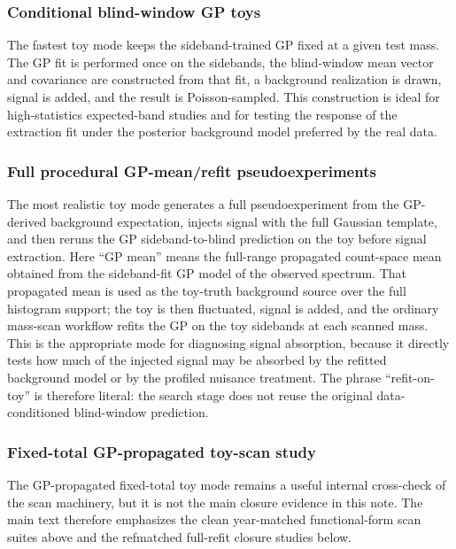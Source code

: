\FloatBarrier

\subsubsection{Conditional blind-window GP toys}

The fastest toy mode keeps the sideband-trained GP fixed at a given test mass. The GP
fit is performed once on the sidebands, the blind-window mean vector and covariance are
constructed from that fit, a background realization is drawn, signal is added, and the
result is Poisson-sampled. This construction is ideal for high-statistics expected-band
studies and for testing the response of the extraction fit under the posterior
background model preferred by the real data.

\subsubsection{Full procedural GP-mean/refit pseudoexperiments}

The most realistic toy mode generates a full pseudoexperiment from the GP-derived
background expectation, injects signal with the full Gaussian template, and then reruns
the GP sideband-to-blind prediction on the toy before signal extraction. Here ``GP
mean'' means the full-range propagated count-space mean obtained from the sideband-fit
GP model of the observed spectrum. That propagated mean is used as the toy-truth
background source over the full histogram support; the toy is then fluctuated, signal
is added, and the ordinary mass-scan workflow refits the GP on the toy sidebands at
each scanned mass. This is the appropriate mode for diagnosing signal absorption,
because it directly tests how much of the injected signal may be absorbed by the
refitted background model or by the profiled nuisance treatment. The phrase
``refit-on-toy'' is therefore literal: the search stage does not reuse the original
data-conditioned blind-window prediction.

\subsubsection{Fixed-total GP-propagated toy-scan study}

The GP-propagated fixed-total toy mode remains a useful internal cross-check of the
scan machinery, but it is not the main closure evidence in this note. The main text
therefore emphasizes the clean year-matched functional-form scan suites above and the
refmatched full-refit closure studies below.

